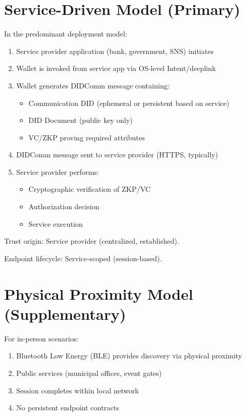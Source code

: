 \section{Service-Driven Model (Primary)}

In the predominant deployment model:
\begin{enumerate}
  \item Service provider application (bank, government, SNS) initiates
  \item Wallet is invoked from service app via OS-level Intent/deeplink
  \item Wallet generates DIDComm message containing:
    \begin{itemize}
      \item Communication DID (ephemeral or persistent based on service)
      \item DID Document (public key only)
      \item VC/ZKP proving required attributes
    \end{itemize}
  \item DIDComm message sent to service provider (HTTPS, typically)
  \item Service provider performs:
    \begin{itemize}
      \item Cryptographic verification of ZKP/VC
      \item Authorization decision
      \item Service execution
    \end{itemize}
\end{enumerate}

Trust origin: Service provider (centralized, established).

Endpoint lifecycle: Service-scoped (session-based).

\section{Physical Proximity Model (Supplementary)}

For in-person scenarios:
\begin{enumerate}
  \item Bluetooth Low Energy (BLE) provides discovery via physical proximity
  \item Public services (municipal offices, event gates)
  \item Session completes within local network
  \item No persistent endpoint contracts
\end{enumerate}

